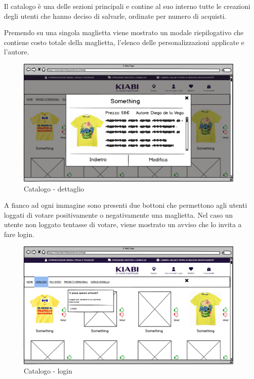\documentclass[12pt,italian,]{report}
\begin{document}
Il catalogo è una delle sezioni principali e contine al suo interno
tutte le creazioni degli utenti che hanno deciso di salvarle, ordinate
per numero di acquisti.

Premendo su una singola maglietta viene mostrato un modale riepilogativo
che contiene costo totale della maglietta, l'elenco delle
personalizzazioni applicate e l'autore.

\begin{figure}[h]
\centering
\includegraphics{img/balsamiq/Catalogodetails.png}
\caption{Catalogo - dettaglio}
\end{figure}

A fianco ad ogni immagine sono presenti due bottoni che permettono agli
utenti loggati di votare positivamente o negativamente una maglietta.
Nel caso un utente non loggato tentasse di votare, viene mostrato un
avviso che lo invita a fare login.

\begin{figure}[h]
\centering
\includegraphics{img/balsamiq/Catalogologin.png}
\caption{Catalogo - login}
\end{figure}
\end{document}
